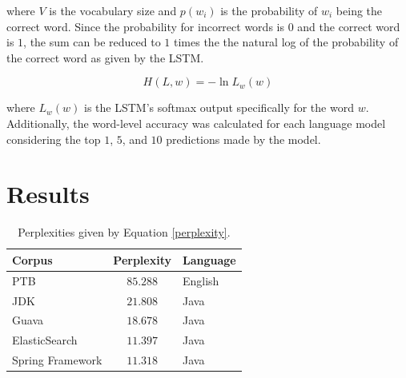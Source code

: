 \documentclass[runningheads,a4paper]{llncs}
\begin{document}
where $V$ is the vocabulary size and $p(w_i)$ is the probability of
$w_i$ being the correct word. Since the probability for incorrect
words is $0$ and the correct word is $1$, the sum can be reduced to
$1$ times the the natural log of the probability of the correct word
as given by the LSTM.

\begin{equation}
    H(L,w) = - \ln L_w(w)
\end{equation}

where $L_w(w)$ is the LSTM's softmax output specifically for the
word $w$. Additionally, the word-level accuracy was calculated for
each language model considering the top $1$, $5$, and $10$ predictions
made by the model.




\section{Results}

\begin{table}[t]
    \caption{Perplexities given by Equation \ref{perplexity}.}
    \label{result-table}
    \vskip 0.15in
    \begin{center}
    \begin{tabular}{lcl}
    \hline
    Corpus & Perplexity & Language \\
    \hline
    PTB                 & $85.288$ & English \\
    JDK                 & $21.808$ & Java \\
    Guava               & $18.678$ & Java \\
    ElasticSearch       & $11.397$ & Java \\
    Spring Framework    & $11.318$ & Java \\
    \hline
    \end{tabular}
    \end{center}
    \vskip -0.1in
\end{table}
\end{document}

